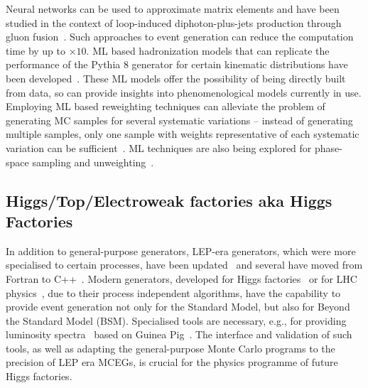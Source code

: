 \documentclass[10pt,a4paper]{article}
\begin{document}
Neural networks can be used to approximate matrix elements and have been studied
in the context of loop-induced diphoton-plus-jets production through gluon
fusion~\cite{Moodie:2022flt}. Such approaches to event generation can reduce the
computation time by up to $\times 10$. ML based hadronization models that can
replicate the performance of the Pythia 8 generator for certain kinematic
distributions have been
developed~\cite{Ilten:2022jfm, Bierlich:2023fmh, Ghosh:2022zdz, Chan:2023ume}.
These ML models offer the possibility of being directly built from data, so can
provide insights into phenomenological models currently in use. Employing ML
based reweighting techniques can alleviate the problem of generating MC samples
for several systematic variations -- instead of generating multiple samples,
only one sample with weights representative of each systematic variation can be
sufficient~\cite{CMS:2024jdl}. ML techniques are also being explored
for phase-space sampling and unweighting~\cite{Butter:2022rso}.

\subsection{Higgs/Top/Electroweak factories aka Higgs
Factories}\label{higgstopelectroweak-factories-aka-higgs-factories}

In addition to general-purpose generators, LEP-era generators, which were more
specialised to certain processes, have been
updated~\cite{Jadach:1999vf,CarloniCalame:2003yt,Jadach:1991by,Denner:2000bj}
and several have moved from Fortran to C++~\cite{Jadach:2022mbe, Sjostrand:2014zea}.
Modern generators, developed for Higgs factories~\cite{Kilian:2007gr, Sherpa:2024mfk}
or for LHC physics~\cite{Frixione:2021zdp,Sherpa:2019gpd},  due to their process
independent algorithms, have the capability to provide event generation not only
for the Standard Model, but also for Beyond the Standard Model (BSM). Specialised tools are necessary,
e.g., for providing luminosity spectra~\cite{Ohl:1996fi} based on Guinea Pig~\cite{Schulte:1998au}.
The interface and validation of such tools, as well as adapting the general-purpose
Monte Carlo programs to the precision of LEP era MCEGs, is crucial for the
physics programme of future Higgs factories.
\end{document}
